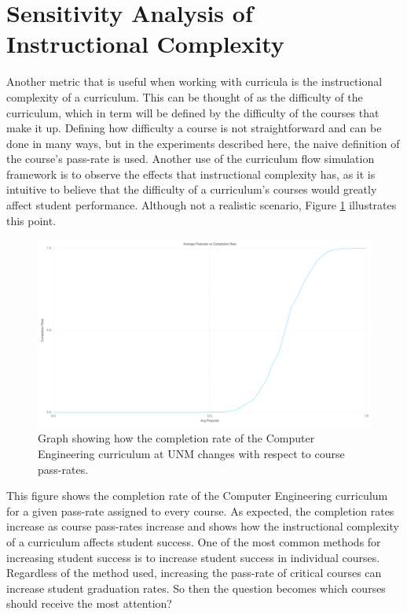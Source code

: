 \documentclass[botnum, fleqn]{unmeethesis}
\begin{document}
  \section{Sensitivity Analysis of Instructional Complexity}
    Another metric that is useful when working with curricula is the instructional complexity of a curriculum. This can be thought of as the difficulty of the curriculum, which in term will be defined by the difficulty of the courses that make it up. Defining how difficulty a course is not straightforward and can be done in many ways, but in the experiments described here, the naive definition of the course's pass-rate is used. Another use of the curriculum flow simulation framework is to observe the effects that instructional complexity has, as it is intuitive to believe that the difficulty of a curriculum's courses would greatly affect student performance. Although not a realistic scenario, Figure \ref{fig:instructional} illustrates this point.

    \begin{figure}[h!]
      \centerline{\includegraphics[scale=0.2]{./figures/instructional.png}}
      \caption{Graph showing how the completion rate of the Computer Engineering curriculum at UNM changes with respect to course pass-rates.} 
      \label{fig:instructional}
    \end{figure}

    This figure shows the completion rate of the Computer Engineering curriculum for a given pass-rate assigned to every course. As expected, the completion rates increase as course pass-rates increase and shows how the instructional complexity of a curriculum affects student success. One of the most common methods for increasing student success is to increase student success in individual courses. Regardless of the method used, increasing the pass-rate of critical courses can increase student graduation rates. So then the question becomes which courses should receive the most attention?
\end{document}
